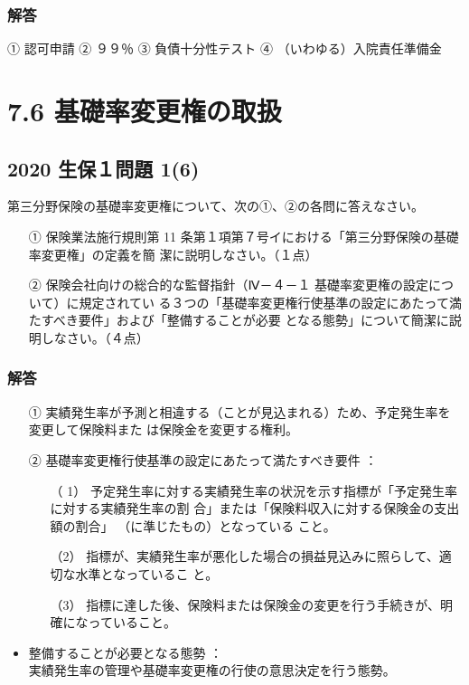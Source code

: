 \documentclass[report,gutter=10mm,fore-edge=10mm,uplatex,dvipdfmx]{jlreq}
\begin{document}
\subsubsection{解答}
① 認可申請 ② ９９％ ③ 負債十分性テスト ④ （いわゆる）入院責任準備金


\section{7.6 基礎率変更権の取扱}
\subsection{2020 生保１問題 1(6)}
第三分野保険の基礎率変更権について、次の①、②の各問に答えなさい。
\begin{enumerate}
 \item [①]  保険業法施行規則第 11 条第１項第７号イにおける「第三分野保険の基礎率変更権」の定義を簡
 潔に説明しなさい。（１点）
 \item [②] 保険会社向けの総合的な監督指針（Ⅳ－４－１ 基礎率変更権の設定について）に規定されてい
 る３つの「基礎率変更権行使基準の設定にあたって満たすべき要件」および「整備することが必要
 となる態勢」について簡潔に説明しなさい。（４点）
\end{enumerate}
\subsubsection{解答}
\begin{itemize}
 \item [①] 実績発生率が予測と相違する（ことが見込まれる）ため、予定発生率を変更して保険料また
 は保険金を変更する権利。
 \item [②] 基礎率変更権行使基準の設定にあたって満たすべき要件 ：
\begin{enumerate}
 \item [（ 1）] 予定発生率に対する実績発生率の状況を示す指標が「予定発生率に対する実績発生率の割
 合」または「保険料収入に対する保険金の支出額の割合」
 （に準じたもの）となっている
 こと。
 \item  [（2）]指標が、実績発生率が悪化した場合の損益見込みに照らして、適切な水準となっているこ
 と。
 \item  [（3）]指標に達した後、保険料または保険金の変更を行う手続きが、明確になっていること。
\end{enumerate} 
 \item 整備することが必要となる態勢 ：\\
 実績発生率の管理や基礎率変更権の行使の意思決定を行う態勢。
\end{itemize}
\end{document}
